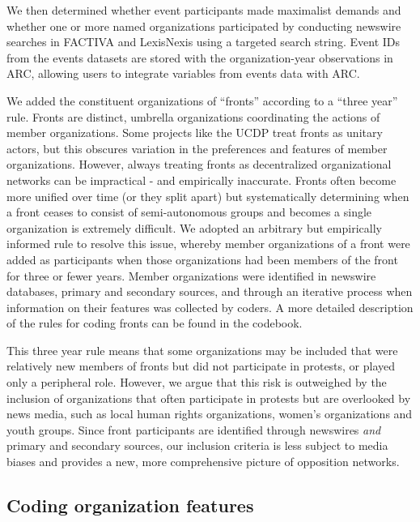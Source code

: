 We then determined whether event participants made maximalist demands and whether one or more named organizations participated by conducting newswire searches in FACTIVA and LexisNexis using a targeted search string. Event IDs from the events datasets are stored with the organization-year observations in ARC, allowing users to integrate variables from events data with ARC. 

We added the constituent organizations of ``fronts'' according to a ``three year'' rule. Fronts are distinct, umbrella organizations coordinating the actions of member organizations. Some projects like the UCDP treat fronts as unitary actors, but this obscures variation in the preferences and features of member organizations. However, always treating fronts as decentralized organizational networks can be impractical - and empirically inaccurate. Fronts often become more unified over time (or they split apart) but systematically determining when a front ceases to consist of semi-autonomous groups and becomes a single organization is extremely difficult. We adopted an arbitrary but empirically informed rule to resolve this issue, whereby member organizations of a front were added as participants when those organizations had been members of the front for three or fewer years. Member organizations were identified in newswire databases, primary and secondary sources, and through an iterative process when information on their features was collected by coders.  A more detailed description of the rules for coding fronts can be found in the codebook. 

This three year rule means that some organizations may be included that were relatively new members of fronts but did not participate in protests, or played only a peripheral role. However, we argue that this risk is outweighed by the inclusion of organizations that often participate in protests but are overlooked by news media, such as local human rights organizations, women's organizations and youth groups. Since front participants are identified through newswires \textit{and} primary and secondary sources, our inclusion criteria is less subject to media biases and provides a new, more comprehensive picture of opposition networks.


\subsection{Coding organization features}

